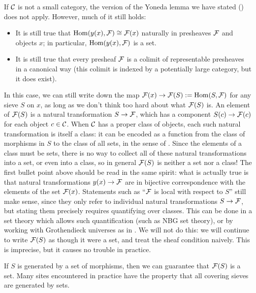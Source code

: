 If $\catC$ is not a small category, the version of the Yoneda lemma we have stated () does not apply. However, much of it still holds:
\begin{itemize}
    \item It is still true that $\Hom(y(x),\cal{F}) \cong \cal{F}(x)$ naturally in presheaves $\cal{F}$ and objects $x$; in particular, $\Hom(y(x),\cal{F})$ is a set.
    \item It is still true that every presheaf $\cal{F}$ is a colimit of representable presheaves in a canonical way (this colimit is indexed by a potentially large category, but it does exist).
\end{itemize}

In this case, we can still write down the map $\cal{F}(x) \to \cal{F}(S) := \Hom(S,\cal{F})$ for any sieve $S$ on $x$, as long as we don't think too hard about what $\cal{F}(S)$ is. An element of $\cal{F}(S)$ is a natural transformation $S \to \cal{F}$, which has a component $S(c) \to \cal{F}(c)$ for each object $c \in \catC$. When $\catC$ has a proper class of objects, each such natural transformation is itself a class: it can be encoded as a function from the class of morphisms in $S$ to the class of all sets, in the sense of . Since the elements of a class must be sets, there is no way to collect all of these natural transformations into a set, or even into a class, so in general $\cal{F}(S)$ is neither a set nor a class! The first bullet point above should be read in the same spirit: what is actually true is that natural transformations $y(x) \to \cal{F}$ are in bijective correspondence with the elements of the set $\cal{F}(x)$. Statements such as ``$\cal{F}$ is local with respect to $S$'' still make sense, since they only refer to individual natural transformations $S \to \cal{F}$, but stating them precisely requires quantifying over classes. This can be done in a set theory which allows such quantification (such as NBG set theory), or by working with Grothendieck universes as in . We will not do this: we will continue to write $\cal{F}(S)$ as though it were a set, and treat the sheaf condition naively. This is imprecise, but it causes no trouble in practice.

If $S$ is generated by a set of morphisms, then we can guarantee that $\cal{F}(S)$ is a set. Many sites encountered in practice have the property that all covering sieves are generated by sets.

